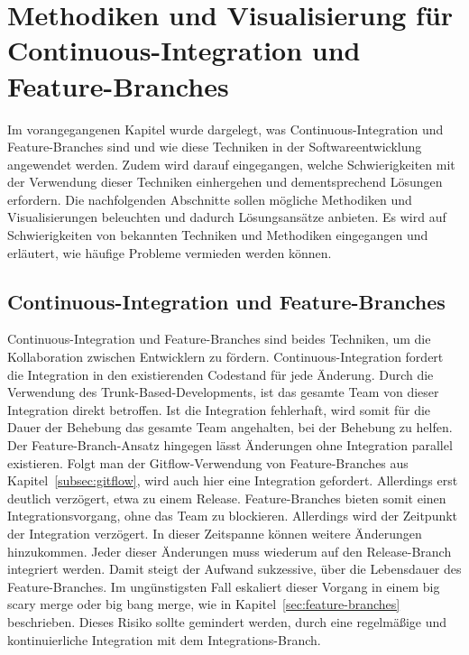 \chapter[Methodiken und Visualisierung]{Methodiken und Visualisierung für Continuous-Integration und Feature-Branches}
\label{ch:visu_meth}

Im vorangegangenen Kapitel wurde dargelegt, was Continuous-Integration und Feature-Branches sind und wie diese Techniken in der Softwareentwicklung angewendet werden. Zudem wird darauf eingegangen, welche Schwierigkeiten mit der Verwendung dieser Techniken einhergehen und dementsprechend Lösungen erfordern. 
Die nachfolgenden Abschnitte sollen mögliche Methodiken und Visualisierungen beleuchten und dadurch Lösungsansätze anbieten. Es wird auf Schwierigkeiten von bekannten Techniken und Methodiken eingegangen und erläutert, wie häufige Probleme vermieden werden können.

\section{Continuous-Integration und Feature-Branches}

Continuous-Integration und Feature-Branches sind beides Techniken, um die Kollaboration zwischen Entwicklern zu fördern. Continuous-Integration fordert die Integration in den existierenden Codestand für jede Änderung. Durch die Verwendung des Trunk-Based-Developments, ist das gesamte Team von dieser Integration direkt betroffen. Ist die Integration fehlerhaft, wird somit für die Dauer der Behebung das gesamte Team angehalten, bei der Behebung zu helfen. Der Feature-Branch-Ansatz hingegen lässt Änderungen ohne Integration parallel existieren. Folgt man der Gitflow-Verwendung von Feature-Branches aus Kapitel~\ref{subsec:gitflow}, wird auch hier eine Integration gefordert. Allerdings erst deutlich verzögert, etwa zu einem Release. Feature-Branches bieten somit einen Integrationsvorgang, ohne das Team zu blockieren. Allerdings wird der Zeitpunkt der Integration verzögert. In dieser Zeitspanne können weitere Änderungen hinzukommen. Jeder dieser Änderungen muss wiederum auf den Release-Branch integriert werden. Damit steigt der Aufwand sukzessive, über die Lebensdauer des Feature-Branches. Im ungünstigsten Fall eskaliert dieser Vorgang in einem \glqq big scary merge\grqq{} oder \glqq big bang merge\grqq{}, wie in Kapitel~\ref{sec:feature-branches} beschrieben. Dieses Risiko sollte gemindert werden, durch eine regelmäßige und kontinuierliche Integration mit dem Integrations-Branch.\\

